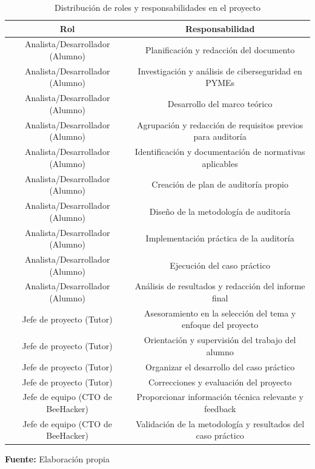 \documentclass[a4paper, 10pt]{article}
\begin{document}
\begin{table}[H]
    \centering
    \caption{Distribución de roles y responsabilidades en el proyecto}
    \begin{tabular}{|c|c|}

        \hline
        \textbf{Rol} & \textbf{Responsabilidad} \\
        \hline
        Analista/Desarrollador (Alumno) & Planificación y redacción del documento \\
        \hline
        Analista/Desarrollador (Alumno) & Investigación y análisis de ciberseguridad en PYMEs \\
        \hline
        Analista/Desarrollador (Alumno) & Desarrollo del marco teórico \\
        \hline
        Analista/Desarrollador (Alumno) & Agrupación y redacción de requisitos previos para auditoría \\
        \hline
        Analista/Desarrollador (Alumno) & Identificación y documentación de normativas aplicables \\
        \hline
        Analista/Desarrollador (Alumno) & Creación de plan de auditoría propio \\
        \hline
        Analista/Desarrollador (Alumno) & Diseño de la metodología de auditoría \\
        \hline
        Analista/Desarrollador (Alumno) & Implementación práctica de la auditoría \\
        \hline
        Analista/Desarrollador (Alumno) & Ejecución del caso práctico \\
        \hline
        Analista/Desarrollador (Alumno) & Análisis de resultados y redacción del informe final \\
        \hline
        Jefe de proyecto (Tutor) & Asesoramiento en la selección del tema y enfoque del proyecto \\
        \hline
        Jefe de proyecto (Tutor) & Orientación y supervisión del trabajo del alumno \\
        \hline
        Jefe de proyecto (Tutor) & Organizar el desarrollo del caso práctico \\
        \hline
        Jefe de proyecto (Tutor) & Correcciones y evaluación del proyecto \\
        \hline
        Jefe de equipo (CTO de BeeHacker) & Proporcionar información técnica relevante y feedback \\
        \hline
        Jefe de equipo (CTO de BeeHacker) & Validación de la metodología y resultados del caso práctico \\
        \hline

    \end{tabular}
    \begin{flushleft}\centering
        \footnotesize \textbf{Fuente:} Elaboración propia
    \end{flushleft}    
    \label{tab:distribucion_roles}
\end{table}
\end{document}
